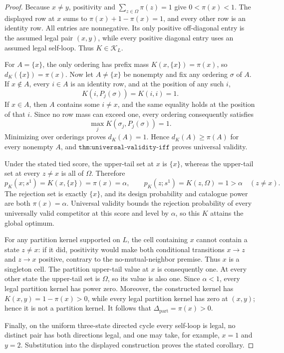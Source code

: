 \documentclass{article}
\begin{document}
\begin{proof}
Because \(x\neq y\), positivity and \(\sum_{z\in\Omega}\pi(z)=1\) give \(0<\pi(x)<1\).  The displayed row at \(x\) sums to \(\pi(x)+1-\pi(x)=1\), and every other row is an identity row.  All entries are nonnegative.  Its only positive off-diagonal entry is the assumed legal pair \((x,y)\), while every positive diagonal entry uses an assumed legal self-loop.  Thus \(K\in\mathcal K_L\).

For \(A=\{x\}\), the only ordering has prefix mass \(K(x,\{x\})=\pi(x)\), so \(d_K(\{x\})=\pi(x)\).  Now let \(A\neq\{x\}\) be nonempty and fix any ordering \(\sigma\) of \(A\).  If \(x\notin A\), every \(i\in A\) is an identity row, and at the position of any such \(i\),
\[
 K(i,P_j(\sigma))=K(i,i)=1.
\]
If \(x\in A\), then \(A\) contains some \(i\neq x\), and the same equality holds at the position of that \(i\).  Since no row mass can exceed one, every ordering consequently satisfies
\[
 \max_j K(\sigma_j,P_j(\sigma))=1.
\]
Minimizing over orderings proves \(d_K(A)=1\).  Hence \(d_K(A)\geq\pi(A)\) for every nonempty \(A\), and \(\texttt{thm:universal-validity-iff}\) proves universal validity.

Under the stated tied score, the upper-tail set at \(x\) is \(\{x\}\), whereas the upper-tail set at every \(z\neq x\) is all of \(\Omega\).  Therefore
\[
 p_K(x;s^1)=K(x,\{x\})=\pi(x)=\alpha,
 \qquad
 p_K(z;s^1)=K(z,\Omega)=1>\alpha\quad(z\neq x).
\]
The rejection set is exactly \(\{x\}\), and its design probability and catalogue power are both \(\pi(x)=\alpha\).  Universal validity bounds the rejection probability of every universally valid competitor at this score and level by \(\alpha\), so this \(K\) attains the global optimum.

For any partition kernel supported on \(L\), the cell containing \(x\) cannot contain a state \(z\neq x\): if it did, positivity would make both conditional transitions \(x\to z\) and \(z\to x\) positive, contrary to the no-mutual-neighbor premise.  Thus \(x\) is a singleton cell.  The partition upper-tail value at \(x\) is consequently one.  At every other state the upper-tail set is \(\Omega\), so its value is also one.  Since \(\alpha<1\), every legal partition kernel has power zero.  Moreover, the constructed kernel has \(K(x,y)=1-\pi(x)>0\), while every legal partition kernel has zero at \((x,y)\); hence it is not a partition kernel.  It follows that \(\Delta_{\mathrm{part}}=\pi(x)>0\).

Finally, on the uniform three-state directed cycle every self-loop is legal, no distinct pair has both directions legal, and one may take, for example, \(x=1\) and \(y=2\).  Substitution into the displayed construction proves the stated corollary.
\end{proof}
\end{document}

